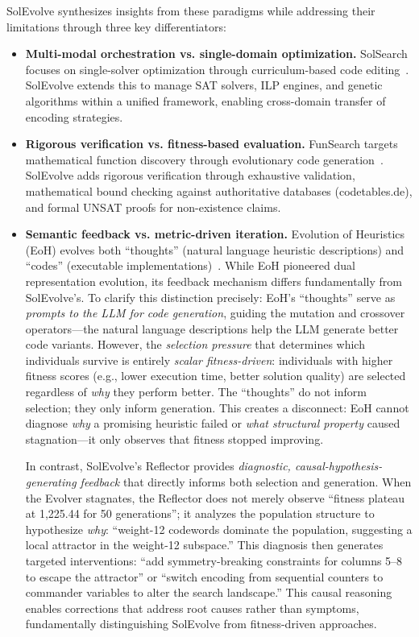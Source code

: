 SolEvolve synthesizes insights from these paradigms while addressing their limitations through three key differentiators:

\begin{itemize}
\item \textbf{Multi-modal orchestration vs. single-domain optimization.} SolSearch focuses on single-solver optimization through curriculum-based code editing~\cite{Zhang2025SolSearch}. SolEvolve extends this to manage SAT solvers, ILP engines, and genetic algorithms within a unified framework, enabling cross-domain transfer of encoding strategies.

\item \textbf{Rigorous verification vs. fitness-based evaluation.} FunSearch targets mathematical function discovery through evolutionary code generation~\cite{RomeraParedes2024FunSearch}. SolEvolve adds rigorous verification through exhaustive validation, mathematical bound checking against authoritative databases (codetables.de), and formal UNSAT proofs for non-existence claims.

\item \textbf{Semantic feedback vs. metric-driven iteration.} Evolution of Heuristics (EoH) evolves both ``thoughts'' (natural language heuristic descriptions) and ``codes'' (executable implementations)~\cite{Liu2024EoH}. While EoH pioneered dual representation evolution, its feedback mechanism differs fundamentally from SolEvolve's. To clarify this distinction precisely: EoH's ``thoughts'' serve as \textit{prompts to the LLM for code generation}, guiding the mutation and crossover operators---the natural language descriptions help the LLM generate better code variants. However, the \textit{selection pressure} that determines which individuals survive is entirely \textit{scalar fitness-driven}: individuals with higher fitness scores (e.g., lower execution time, better solution quality) are selected regardless of \textit{why} they perform better. The ``thoughts'' do not inform selection; they only inform generation. This creates a disconnect: EoH cannot diagnose \textit{why} a promising heuristic failed or \textit{what structural property} caused stagnation---it only observes that fitness stopped improving.

In contrast, SolEvolve's Reflector provides \textit{diagnostic, causal-hypothesis-generating feedback} that directly informs both selection and generation. When the Evolver stagnates, the Reflector does not merely observe ``fitness plateau at 1,225.44 for 50 generations''; it analyzes the population structure to hypothesize \textit{why}: ``weight-12 codewords dominate the population, suggesting a local attractor in the weight-12 subspace.'' This diagnosis then generates targeted interventions: ``add symmetry-breaking constraints for columns 5--8 to escape the attractor'' or ``switch encoding from sequential counters to commander variables to alter the search landscape.'' This causal reasoning enables corrections that address root causes rather than symptoms, fundamentally distinguishing SolEvolve from fitness-driven approaches.
\end{itemize}
